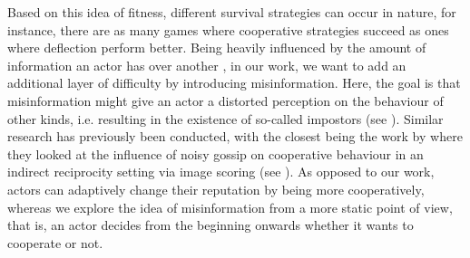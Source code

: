 \documentclass[sigconf]{acmart}
\newcommand{\todo}[1]{{\color{red}{#1}}}
\begin{document}

    Based on this idea of fitness, different survival strategies can occur in nature, for instance, there are as many games where cooperative strategies succeed as ones where deflection perform better.
    Being heavily influenced by the amount of information an actor has over another \cite{wallace_misinformation_1973}, in our work, we want to add an additional layer of difficulty by introducing misinformation.
    Here, the goal is that misinformation might give an actor a distorted perception on the behaviour of other kinds, i.e. resulting in the existence of so-called impostors (see ).
    Similar research has previously been conducted, with the closest being the work by \citeauthor{szamado_deception_2016} \cite{szamado_deception_2016} where they looked at the influence of noisy gossip on cooperative behaviour in an indirect reciprocity setting via image scoring (see ).
    As opposed to our work, actors can adaptively change their reputation by being more cooperatively, whereas we explore the idea of misinformation from a more static point of view, that is, an actor decides from the beginning onwards whether it wants to cooperate or not.
    
\end{document}
